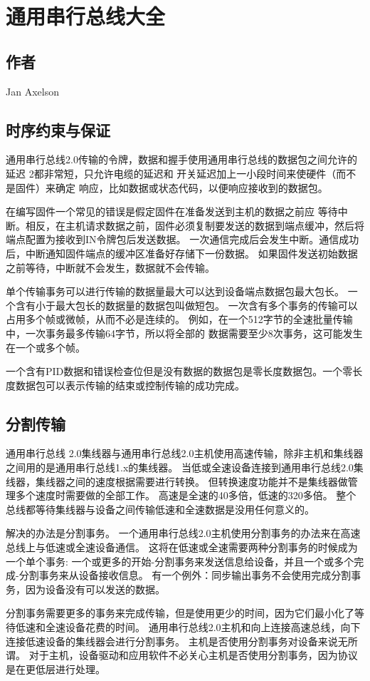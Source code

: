 
\chapter{通用串行总线大全}
\section{作者}
Jan Axelson
\section{时序约束与保证}
通用串行总线2.0传输的令牌，数据和握手使用通用串行总线的数据包之间允许的延迟
2都非常短，只允许电缆的延迟和
开关延迟加上一小段时间来使硬件（而不是固件）来确定
响应，比如数据或状态代码，以便响应接收到的数据包。

在编写固件一个常见的错误是假定固件在准备发送到主机的数据之前应
等待中断。相反，在主机请求数据之前，固件必须复制要发送的数据到端点缓冲，然后将端点配置为接收到IN令牌包后发送数据。
一次通信完成后会发生中断。通信成功后，中断​​通知固件端点的缓冲区准备好存储下一份数据。
如果固件发送初始数据之前等待，中断就不会发生，数据就不会传输。

单个传输事务可以进行传输的数据量最大可以达到设备端点数据包最大包长。
一个含有小于最大包长的数据量的数据包叫做短包。
一次含有多个事务的传输可以占用多个帧或微帧，从而不必是连续的。
例如，在一个512字节的全速批量传输中，一次事务最多传输64字节，所以将全部的
数据需要至少8次事务，这可能发生在一个或多个帧。

一个含有PID数据和错误检查位但是没有数据的数据包是零长度数据包。一个零长度数据包可以表示传输的结束或控制传输的成功完成。
\section{分割传输}

通用串行总线 2.0集线器与通用串行总线2.0主机使用高速传输，除非​​主机和集线器之间用的是通用串行总线1.x的集线器。
当低或全速设备连接到通用串行总线2.0集线器，集线器之间的速度根据需要进行转换。
但转换速度功能并不是集线器做管理多个速度时需要做的全部工作。
高速是全速的40多倍，低速的320多倍。
整个总线都等待集线器与设备之间传输低速和全速数据是没用任何意义的。

解决的办法是分割事务。
一个通用串行总线2.0主机使用分割事务的办法来在高速总线上与低速或全速设备通信。
这将在低速或全速需要两种分割事务的时候成为一个单个事务:
一个或更多的开始-分割事务来发送信息给设备，并且一个或多个完成-分割事务来从设备接收信息。
有一个例外：同步输出事务不会使用完成分割事务，因为设备没有可以发送的数据。

分割事务需要更多的事务来完成传输，但是使用更少的时间，因为它们最小化了等待低速和全速设备花费的时间。
通用串行总线2.0主机和向上连接高速总线，向下连接低速设备的集线器会进行分割事务。
主机是否使用分割事务对设备来说无所谓。
对于主机，设备驱动和应用软件不必关心主机是否使用分割事务，因为协议是在更低层进行处理。